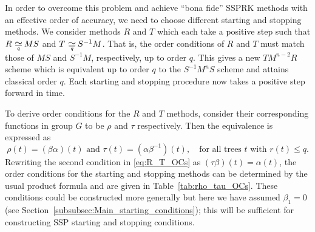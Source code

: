 \documentclass{siamltex}  %
\begin{document}
In order to overcome this problem and achieve ``bona fide''
SSPRK methods with an effective order of accuracy, we need to choose different 
starting and stopping methods. 
We consider methods $R$ and $T$ which each take a positive step such that 
$R \equival{q} MS$ and $T \equival{q} S^{-1}M$.
That is, the order conditions of $R$ and $T$ must match those of
$MS$ and $S^{-1}M$, respectively, up to order $q$.
This gives a new $TM^{n-2}R$ scheme which is equivalent up to order $q$ 
to the $S^{-1}M^nS$ scheme and attains classical order $q$.
Each starting and stopping procedure now takes a positive step forward
in time.

To derive order conditions for the $R$ and $T$ methods, consider their
corresponding functions in group $G$ to be $\rho$ and $\tau$
respectively.
Then the equivalence is expressed as
\begin{equation} \label{eq:R_T_OCs}
    \rho(t) = (\beta\alpha)(t) \text{ and } \tau(t) = (\alpha\beta^{-1})(t), \quad \text{for all 
    trees $t$ with $r(t) \leq q$.}
\end{equation}
Rewriting the second condition in \eqref{eq:R_T_OCs} as 
$(\tau\beta)(t) = \alpha(t)$, the order conditions for the starting and stopping 
methods can be determined by the usual product formula and are given in Table~\ref{tab:rho_tau_OCs}.
These conditions could be constructed more generally but here we have
assumed $\beta_1=0$ (see Section~\ref{subsubsec:Main_starting_conditions}); this
will be sufficient for constructing SSP starting and stopping
conditions.
\end{document}
